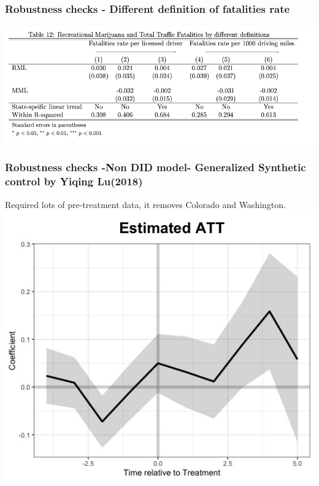 \documentclass{beamer}
\begin{document}
\begin{frame} %
\frametitle{Robustness checks - Different definition of fatalities rate}
	
	\includegraphics[scale = 0.33]{table12}
	
\end{frame}

\begin{frame} %
\frametitle{Robustness checks -Non DID model- Generalized Synthetic control by Yiqing Lu(2018)  }
		Required lots of pre-treatment data, it removes Colorado and Washington. 
	\includegraphics[scale = 0.38]{Generalized_synthetic}
\end{frame}
\end{document}
